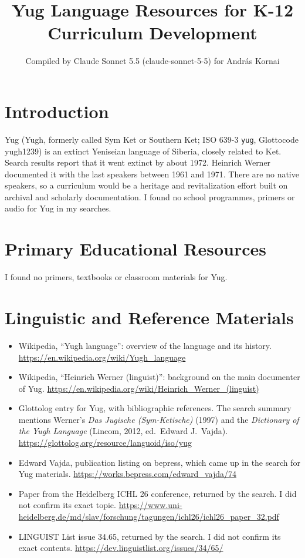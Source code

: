 \documentclass[12pt]{article}
\title{Yug Language Resources for K-12 Curriculum Development}
\author{Compiled by Claude Sonnet 5.5 (claude-sonnet-5-5) for Andr\'as Kornai}
\date{}
\begin{document}
\maketitle

\section{Introduction}
Yug (Yugh, formerly called Sym Ket or Southern Ket; ISO 639-3 \texttt{yug}, Glottocode yugh1239) is an extinct Yeniseian language of Siberia, closely related to Ket. Search results report that it went extinct by about 1972. Heinrich Werner documented it with the last speakers between 1961 and 1971. There are no native speakers, so a curriculum would be a heritage and revitalization effort built on archival and scholarly documentation. I found no school programmes, primers or audio for Yug in my searches.

\section{Primary Educational Resources}
I found no primers, textbooks or classroom materials for Yug.

\section{Linguistic and Reference Materials}
\begin{itemize}
\item Wikipedia, ``Yugh language'': overview of the language and its history. \url{https://en.wikipedia.org/wiki/Yugh_language}
\item Wikipedia, ``Heinrich Werner (linguist)'': background on the main documenter of Yug. \url{https://en.wikipedia.org/wiki/Heinrich_Werner_(linguist)}
\item Glottolog entry for Yug, with bibliographic references. The search summary mentions Werner's \emph{Das Jugische (Sym-Ketische)} (1997) and the \emph{Dictionary of the Yugh Language} (Lincom, 2012, ed.\ Edward J.\ Vajda). \url{https://glottolog.org/resource/languoid/iso/yug}
\item Edward Vajda, publication listing on bepress, which came up in the search for Yug materials. \url{https://works.bepress.com/edward_vajda/74}
\item Paper from the Heidelberg ICHL 26 conference, returned by the search. I did not confirm its exact topic. \url{https://www.uni-heidelberg.de/md/slav/forschung/tagungen/ichl26/ichl26_paper_32.pdf}
\item LINGUIST List issue 34.65, returned by the search. I did not confirm its exact contents. \url{https://dev.linguistlist.org/issues/34/65/}
\end{itemize}
\end{document}
